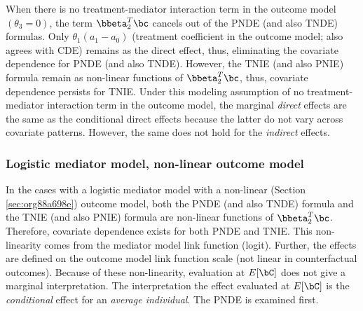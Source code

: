 \documentclass[10pt]{article}
\begin{document}
When there is no treatment-mediator interaction term in the outcome model \((\theta_{3} = 0)\), the term \(\bbeta_{2}^{T}\bc\) cancels out of the PNDE (and also TNDE) formulas. Only \(\theta_{1}(a_{1} - a_{0})\) (treatment coefficient in the outcome model; also agrees with CDE) remains as the direct effect, thus, eliminating the covariate dependence for PNDE (and also TNDE). However, the TNIE (and also PNIE) formula remain as non-linear functions of \(\bbeta_{2}^{T}\bc\), thus, covariate dependence persists for TNIE. Under this modeling assumption of no treatment-mediator interaction term in the outcome model, the marginal \emph{direct} effects are the same as the conditional direct effects because the latter do not vary across covariate patterns. However, the same does not hold for the \emph{indirect} effects.

\subsubsection{Logistic mediator model, non-linear outcome model}
\label{sec:org290f786}
In the cases with a logistic mediator model with a non-linear (Section \ref{sec:org88a698e}) outcome model, both the PNDE (and also TNDE) formula and the TNIE (and also PNIE) formula are non-linear functions of \(\bbeta_{2}^{T}\bc\). Therefore, covariate dependence exists for both PNDE and TNIE. This non-linearity comes from the mediator model link function (logit). Further, the effects are defined on the outcome model link function scale (not linear in counterfactual outcomes). Because of these non-linearity, evaluation at \(E[\bC]\) does not give a marginal interpretation. The interpretation the effect evaluated at \(E[\bC]\) is the \emph{conditional} effect for an \emph{average individual}. The PNDE is examined first.
\end{document}
